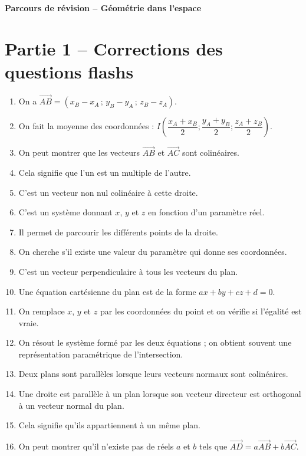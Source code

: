 \documentclass[11pt,a4paper]{article}
\newcounter{question}
\newcounter{reponse}
\newenvironment{blocreponses}[1]{%
  \begin{tcolorbox}[
    enhanced,
    breakable,
    colback=bleuclair,
    colframe=bleufonce,
    coltitle=white,
    colbacktitle=bleufonce,
    title={\bfseries #1},
    fonttitle=\bfseries,
    boxrule=0.6pt,
    arc=2mm,
    left=2mm,
    right=2mm,
    top=2.5mm,
    bottom=1.5mm,
    toptitle=1.2mm,
    bottomtitle=1.2mm,
    lefttitle=2mm,
    righttitle=2mm,
    before upper=\vspace{0.7mm},
    before skip=3.5mm,
    after skip=3mm, fontupper=\large
  ]
  \large
  \begin{enumerate}[leftmargin=*,label=\textbf{\arabic*.},itemsep=0.45em,topsep=0.5em]
  \setcounter{enumi}{\value{reponse}}
}{%
  \setcounter{reponse}{\value{enumi}}
  \end{enumerate}
  \end{tcolorbox}
}
\begin{document}
\begin{center}
{\LARGE\bfseries Parcours de révision -- Géométrie dans l'espace}\\[1mm]

\end{center}
\vspace{2mm}
\tableofcontents
\clearpage

\section*{Partie 1 -- Corrections des questions flashs}
\setcounter{reponse}{0}\begin{blocreponses}{Réponses -- A. Repères, vecteurs, droites et plans}
  \item On a $\overrightarrow{AB}=(x_B-x_A\,;\,y_B-y_A\,;\,z_B-z_A)$.
  \item On fait la moyenne des coordonnées : $I\left(\dfrac{x_A+x_B}{2};\dfrac{y_A+y_B}{2};\dfrac{z_A+z_B}{2}\right)$.
  \item On peut montrer que les vecteurs $\overrightarrow{AB}$ et $\overrightarrow{AC}$ sont colinéaires.
  \item Cela signifie que l'un est un multiple de l'autre.
  \item C'est un vecteur non nul colinéaire à cette droite.
  \item C'est un système donnant $x$, $y$ et $z$ en fonction d'un paramètre réel.
  \item Il permet de parcourir les différents points de la droite.
  \item On cherche s'il existe une valeur du paramètre qui donne ses coordonnées.
  \item C'est un vecteur perpendiculaire à tous les vecteurs du plan.
  \item Une équation cartésienne du plan est de la forme $ax+by+cz+d=0$.
  \item On remplace $x$, $y$ et $z$ par les coordonnées du point et on vérifie si l'égalité est vraie.
  \item On résout le système formé par les deux équations ; on obtient souvent une représentation paramétrique de l'intersection.
  \item Deux plans sont parallèles lorsque leurs vecteurs normaux sont colinéaires.
  \item Une droite est parallèle à un plan lorsque son vecteur directeur est orthogonal à un vecteur normal du plan.
  \item Cela signifie qu'ils appartiennent à un même plan.
  \item On peut montrer qu'il n'existe pas de réels $a$ et $b$ tels que $\overrightarrow{AD}=a\overrightarrow{AB}+b\overrightarrow{AC}$.
\end{blocreponses}
\end{document}
